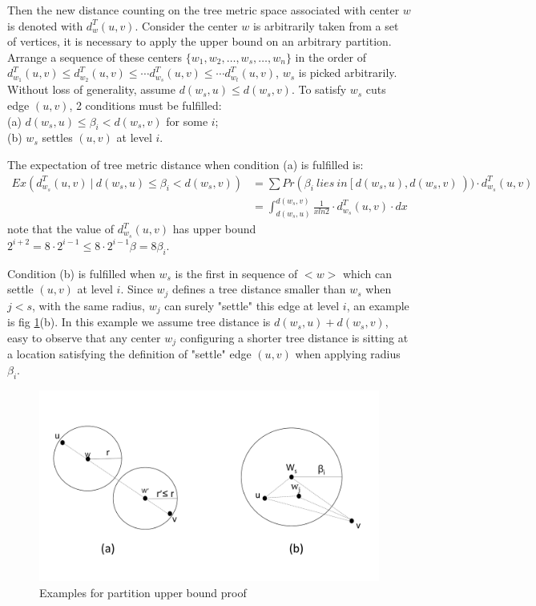 \documentclass[11pt,twoside, onecolumn]{IEEEtran}
\begin{document}
Then the new distance counting on the tree metric space associated with center $w$ is denoted with $d_w^T(u,v)$.
Consider the center $w$ is arbitrarily taken from a set of vertices, it is necessary
to apply the upper bound on an arbitrary partition. Arrange a sequence of these centers $\{w_1, w_2, \dots, w_s,\dots, w_n\}$ in the order of $d_{w_1}^T(u,v) \leq d_{w_2}^T(u,v)\leq\cdots d_{w_s}^T(u,v)\leq \cdots d_{w_t}^T(u,v)$, $w_s$ is picked arbitrarily. Without loss of generality, assume $d(w_s,u)\leq d(w_s,v)$.
To satisfy $w_s$ cuts edge $(u,v)$, 2 conditions must be fulfilled:\\
(a) $d(w_s,u) \leq \beta_i < d(w_s,v)$ for some $i$;\\
(b) $w_s$ settles $(u,v)$ at level $i$.

The expectation of tree metric distance when condition (a) is fulfilled is:
\begin{align}
Ex\left(d_{w_s}^T(u,v)\ |\ d(w_s,u) \leq \beta_i < d(w_s,v)\right) &= \sum Pr(\beta_i\ lies\ in\ [\ d(w_s,u),d(w_s,v)\ ))\cdot d_{w_s}^T(u,v)\nonumber\\
&= \int_{d(w_s,u)}^{d(w_s,v)}\frac{1}{xln2}\cdot d_{w_s}^T(u,v)\cdot dx\nonumber
\end{align} 
note that the value of $d_{w_s}^T(u,v)$ has upper bound $2^{i+2} = 8\cdot 2^{i-1}\leq 8\cdot 2^{i-1}\beta = 8\beta_i$.

Condition (b) is fulfilled when $w_s$ is the first in sequence of $<w>$ which can settle $(u,v)$
at level $i$. Since $w_j$ defines a tree distance smaller than $w_s$ when $j<s$, with the same radius,
 $w_j$ can surely "settle" this edge at level $i$, an example is fig \ref{fig:distance}(b). In this
 example we assume tree distance is $d(w_s,u)+d(w_s,v)$, easy to observe that any center $w_j$
 configuring a shorter tree distance is sitting at a location satisfying the definition of
 "settle" edge $(u,v)$ when applying radius $\beta_i$.
 
 \begin{figure}[hbt]
	\begin{center}
	\includegraphics[scale=0.4]{fig_distance.pdf}
	\end{center}
	\caption{Examples for partition upper bound proof}
	\label{fig:distance}
\end{figure}
 
\end{document}
